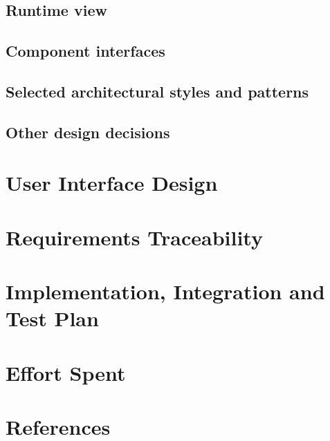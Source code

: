 \documentclass[table, 12pt]{article}
\begin{document}
\subsection{Runtime view}

\subsection{Component interfaces}

\subsection{Selected architectural styles and patterns}

\subsection{Other design decisions}

\section{User Interface Design}


\section{Requirements Traceability}


\section{Implementation, Integration and Test Plan}


\section{Effort Spent}


\section{References}
\end{document}
